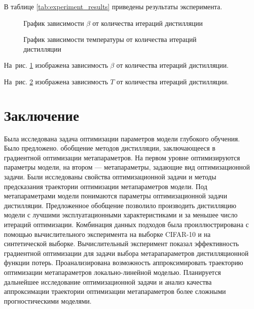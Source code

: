 \documentclass[12pt, twoside]{article}
\begin{document}
В таблице \ref{tab:experiment_results} приведены результаты эксперимента.

\begin{figure}[h]
    \centering
    \caption{График зависимости $\beta$ от количества итераций дистилляции}
    \label{fig:iter_beta}
\end{figure}

\begin{figure}[h]
    \centering
    \caption{График зависимости температуры от количества итераций дистилляции}
    \label{fig:iter_temp}
\end{figure}

На~рис. \ref{fig:iter_beta} изображена зависимость $\beta$ от количества итераций дистилляции.

На~рис. \ref{fig:iter_temp} изображена зависимость $T$ от количества итераций дистилляции.

\section{Заключение}

Была исследована задача оптимизации параметров модели глубокого обучения. Было предложено. обобщение методов дистилляции, заключающееся в градиентной оптимизации метапараметров. На первом уровне оптимизируются параметры модели, на втором --- метапараметры, задающие вид оптимизационной задачи. Были исследованы свойства оптимизационной задачи и методы предсказания траектории оптимизации метапараметров модели. Под метапараметрами модели понимаются параметры оптимизационной задачи дистилляции. Предложенное обобщение позволило производить дистилляцию модели с лучшими эксплуатационными характеристиками и за меньшее число итераций оптимизации. Комбинация данных подходов была проиллюстрирована с помощью вычислительного эксперимента на выборке CIFAR-10 и на синтетической выборке. Вычислительный эксперимент показал эффективность градиентной оптимизации для задачи выбора метарапараметров дистилляционной функции потерь. Проанализирована возможность аппроксимировать траекторию оптимизации метапараметров локально-линейной моделью. Планируется дальнейшее исследование оптимизационной задачи и анализ качества  аппроксимации траектории оптимизации метапараметров более сложными прогностическими моделями.






\end{document}
